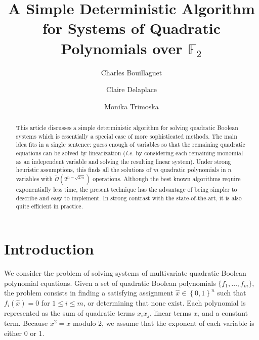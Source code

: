 \documentclass[a4paper,UKenglish,cleveref, autoref]{lipics-v2019}
\title{A Simple Deterministic Algorithm for Systems of Quadratic Polynomials over $\mathbb{F}_2$}
\author{Charles Bouillaguet}{LIP6 laboratory, Sorbonne Université, Paris, France}{charles.bouillaguet@lip6.fr}{https://orcid.org/0000-0001-9416-6244}{}
\author{Claire Delaplace}{MIS Laboratory, Université de Picardie Jules Verne, Amiens, France}{claire.delaplace@u-picardie.fr}{https://orcid.org/0000-0002-5314-1806}{}
\author{Monika Trimoska}{MIS Laboratory, Université de Picardie Jules Verne, Amiens, France}{monika.trimoska@u-picardie.fr}{https://orcid.org/0000-0002-1477-0001}{}
\newcommand{\bits}{\left\{0, 1\right\}}
\newcommand{\bigOsoft}[1]{\ensuremath{\mathcal{\tilde O}\left( #1 \right)} }
\begin{document}
\maketitle

\begin{abstract}
  This article discusses a simple deterministic algorithm for solving quadratic
  Boolean systems which is essentially a special case of more sophisticated
  methods. The main idea fits in a single sentence: guess enough of variables so
  that the remaining quadratic equations can be solved by linearization
  (\textit{i.e.} by considering each remaining monomial as an independent
  variable and solving the resulting linear system). Under strong heuristic
  assumptions, this finds all the solutions of $m$ quadratic polynomials in $n$
  variables with $\bigOsoft{2^{n-\sqrt{2m}}}$ operations. Although the best
  known algorithms require exponentially less time, the present technique has
  the advantage of being simpler to describe and easy to implement. In strong
  contrast with the state-of-the-art, it is also quite efficient in practice.
\end{abstract}


\clearpage

\section{Introduction}

We consider the problem of solving systems of multivariate quadratic Boolean
polynomial equations. Given a set of quadratic Boolean polynomials
$\{f_1, \dots, f_m\}$, the problem consists in finding a satisfying assignment
$\hat x \in \bits^n$ such that $f_i(\hat x) = 0$ for $1 \leq i \leq m$, or
determining that none exist. Each polynomial is represented as the sum of
quadratic terms $x_i x_j$, linear terms $x_i$ and a constant term. Because
$x^2 = x$ modulo 2, we assume that the exponent of each variable is either 0 or
1.


\end{document}
